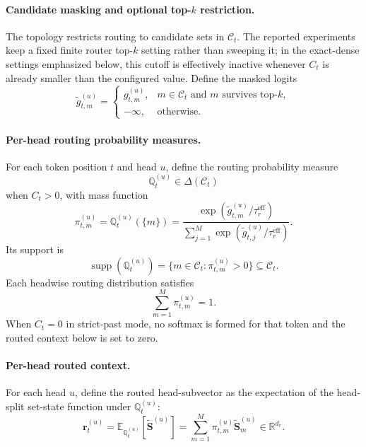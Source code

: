 \documentclass{article}
\theoremstyle{plain}
\theoremstyle{definition}
\theoremstyle{remark}
\begin{document}
\paragraph{Candidate masking and optional top-$k$ restriction.}
The topology restricts routing to candidate sets in $\mathcal C_t$. The reported experiments keep a fixed finite router top-$k$ setting rather than sweeping it; in the exact-dense settings emphasized below, this cutoff is effectively inactive whenever $C_t$ is already smaller than the configured value. Define the masked logits
\begin{equation}
\label{eq:masked-logits}
\widetilde g^{(u)}_{t,m}=
\begin{cases}
g^{(u)}_{t,m},& m\in\mathcal C_t \text{ and } m \text{ survives top-}k,\\
-\infty,& \text{otherwise}.
\end{cases}
\end{equation}

\paragraph{Per-head routing probability measures.}
For each token position $t$ and head $u$, define the routing probability measure
\begin{equation}
\label{eq:routing-probability-measure}
\mathbb Q_t^{(u)}\in\Delta(\mathcal C_t)
\end{equation}
when $C_t>0$, with mass function
\begin{equation}
\label{eq:routing-probabilities}
\pi_{t,m}^{(u)}=\mathbb Q_t^{(u)}(\{m\})
=
\frac{\exp(\widetilde g^{(u)}_{t,m}/\tau_r^{\mathrm{eff}})}{\sum_{j=1}^M \exp(\widetilde g^{(u)}_{t,j}/\tau_r^{\mathrm{eff}})}.
\end{equation}
Its support is
\begin{equation}
\label{eq:routing-support}
\operatorname{supp}(\mathbb Q_t^{(u)})
=
\{m\in\mathcal C_t: \pi_{t,m}^{(u)}>0\}
\subseteq \mathcal C_t.
\end{equation}
Each headwise routing distribution satisfies
\begin{equation}
\label{eq:routing-prob-sum}
\sum_{m=1}^M \pi_{t,m}^{(u)}=1.
\end{equation}
When $C_t=0$ in strict-past mode, no softmax is formed for that token and the routed context below is set to zero.

\paragraph{Per-head routed context.}
For each head $u$, define the routed head-subvector as the expectation of the head-split set-state function under $\mathbb Q_t^{(u)}$:
\begin{equation}
\label{eq:per-head-routed}
\mathbf r_t^{(u)}
=
\mathbb E_{\mathbb Q_t^{(u)}}[\widetilde{\mathbf S}^{(u)}]
=
\sum_{m=1}^M \pi_{t,m}^{(u)}\widetilde{\mathbf S}^{(u)}_m
\in\mathbb R^{d_r}.
\end{equation}
\end{document}
